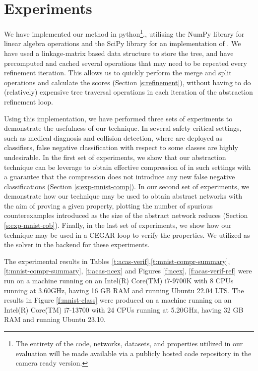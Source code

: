 \section{Experiments} 

We have implemented our method in python\footnote{The entirety of the code,
    networks, datasets, and properties utilized in our evaluation will be made
    available via a publicly hosted code repository in the
camera ready version.}., utilising the NumPy \cite{numpy}
library for linear algebra operations and the SciPy \cite{scipy} library for an
implementation of \hcluster.
We have used a linkage-matrix \cite{scipy-hcluster-linkage}  based
data structure to store the tree, and have precomputed and cached several
operations that may need to be repeated every refinement iteration. This allows
us to quickly perform the merge and split operations and calculate the
scores (Section \ref{s:refinement}), without having to do (relatively)
expensive tree traversal operations in each iteration of the abstraction
refinement loop. 

Using this implementation, we have performed three sets of experiments to
demonstrate the usefulness of our technique. In several safety critical
settings, such as medical diagnosis and collision detection, where \dnn are
deployed as classifiers, false negative classification with respect to some
classes are highly undesirable. In the first set of experiments, we show that
our abstraction technique can be leverage to obtain effective compression of
\dnn in such settings with a guarantee that the compression does not introduce
any new false negative classifications (Section \ref{s:exp-mnist-comp}). In our
second set of experiments, we demonstrate how our technique may be used to
obtain abstract networks with the aim of proving a given property, plotting the
number of spurious counterexamples introduced as the size of the abstract
network reduces (Section \ref{s:exp-mnist-rob}). Finally, in the last set of
experiments, we show how our technique may be used in a CEGAR loop
\cite{cegar-nn} to verify the \acasxu properties. We utilized \abcrown as the 
solver in the backend for these experiments. 

The experimental results in Tables
\ref{t:acas-verif},\ref{t:mnist-compr-summary}, \ref{t:mnist-compr-summary},
\ref{t:acas-ncex} and Figures \ref{f:ncex}, \ref{f:acas-verif-ref} were
run on a machine running on an Intel(R) Core(TM) i7-9700K with 8 CPUs running at
3.60GHz, having 16 GB RAM and running Ubuntu 22.04 LTS. The results in Figure
\ref{f:mnist-class} were produced on a machine running on an 
Intel(R) Core(TM) i7-13700 with 24 CPUs running at
5.20GHz, having 32 GB RAM and running Ubuntu 23.10.

